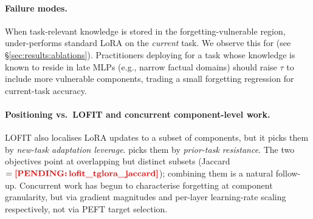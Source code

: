 \paragraph{Failure modes.} When task-relevant knowledge is stored in the forgetting-vulnerable region, \tglora{} under-performs standard LoRA on the \textit{current} task. We observe this for  (see \S\ref{sec:results:ablations}). Practitioners deploying \tglora{} for a task whose knowledge is known to reside in late MLPs (e.g., narrow factual domains) should raise $\tau$ to include more vulnerable components, trading a small forgetting regression for current-task accuracy.

\paragraph{Positioning vs.\ LOFIT and concurrent component-level work.} LOFIT \citep{yin2024lofit} also localises LoRA updates to a subset of components, but it picks them by \textit{new-task adaptation leverage}. \tglora{} picks them by \textit{prior-task resistance}. The two objectives point at overlapping but distinct subsets (Jaccard $=\pend{lofit_tglora_jaccard}$); combining them is a natural follow-up. Concurrent work \citep{anon2026mechforget, lrdistribution2024} has begun to characterise forgetting at component granularity, but via gradient magnitudes and per-layer learning-rate scaling respectively, not via PEFT target selection.
